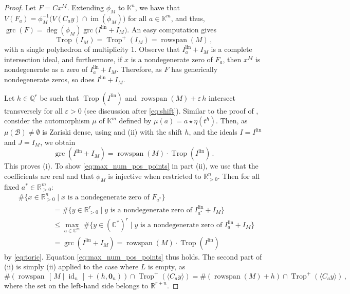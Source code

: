 \documentclass[10pt,a4paper]{amsart}
\newcommand{\CC}{\mathbb{C}}
\newcommand{\QQ}{\mathbb{Q}}
\newcommand{\RR}{\mathbb{R}}
\DeclareMathOperator{\Trop}{Trop}
\DeclareMathOperator{\grc}{grc}
\DeclareMathOperator{\id}{id}
\DeclareMathOperator{\im}{im}
\newcommand{\lin}{{\mathrm{lin}}}
\DeclareMathOperator{\rowspan}{rowspan}
\begin{document}
\begin{proof} 
Let $F=C x^M$. 
Extending $\phi_M$ to $\mathbb{K}^n$,  we have that
$V( F_a )=\phi_M^{-1}\big( V(C_a y) \cap \im(\phi_M)\big)$ for all  
$a\in \mathbb{K}^m$, 
and thus, $\grc ( F) = \deg(\phi_M)  \grc\big(I^{\lin} + I_M \big)$.
An easy computation gives
\[\Trop(I_M)= \Trop^+(I_M)= \rowspan(M)\,, \]
with a single polyhedron of multiplicity 1. 
Observe that 
$I^{\lin}_a + I_M$ is a complete intersection ideal, and furthermore, 
if $x$ is a nondegenerate zero of $F_a$, then $x^M$ is nondegenerate as a zero of 
$I^{\lin}_a + I_M$. Therefore, 
as $F$ has generically nondegenerate zeros, so does $I^{\lin} + I_M$. 

Let $h\in \QQ^r$ be such that $\Trop(I^{\lin})$ and $\rowspan(M)+ \varepsilon\, h$
intersect transversely  for all $\varepsilon>0$ (see discussion after \eqref{eq:shift}). 
Similar to the proof of , 
consider the automorphism $\mu$ of $\mathbb{K}^m$ defined by $\mu(a)=a\star \eta(t^h)$. Then, as $\mu(\mathcal{B})   \neq \emptyset$ is Zariski dense,  
using   and  (ii) with the shift $h$, and the ideals $I=I^{\lin}$ and $J=I_M$, we obtain
\begin{equation}\label{eq:toric}
\grc (I^{\lin}+ I_M) =  \rowspan(M)\cdot \Trop(I^{\lin})\, .
\end{equation}
This proves (i). 
To show \eqref{eq:max_num_pos_points} in part (ii), we use that the coefficients are real and that $\phi_M$ is injective when restricted to $\RR^n_{>0}$. Then  for all fixed $a^*\in \RR^m_{>0}$: 
\begin{align*}
&\#\big \{x\in \RR^n_{>0} \mid x  \text{ is a nondegenerate zero of }F_{a^*} \big\}  \\
&\hspace{2cm} =\# \{y\in \RR^r_{>0} \mid y  \text{ is a nondegenerate zero of } I_{a^*}^{\lin} + I_M  \} \\ 
&\hspace{2cm}\leq  \max_{a\in \CC^m} \ \# \{y \in (\CC^*)^r \mid y  \text{ is a nondegenerate zero of } I^{\lin}_{a} +I_M  \} \\
&\hspace{2cm}=\grc ( I^{\lin} + I_M)=\rowspan(M)\cdot \Trop(I^{\lin}) 
\end{align*}
by \eqref{eq:toric}. Equation \eqref{eq:max_num_pos_points}  thus holds.  
The second part of (ii) is simply  (ii) 
 applied to the case where $L$ is empty, 
 as 
\[ \# (\rowspan\,[\,M\mid \id_n\,]+(h,\mathbf{0}_{n} ))\cap \Trop^+(\langle C_a y  \rangle) =\# (\rowspan(M)+h) \cap \Trop^+(\langle C_a y   \rangle)  \, , \]
where the set on the left-hand side belongs to $\RR^{r+n}$. 
\end{proof}
\end{document}

